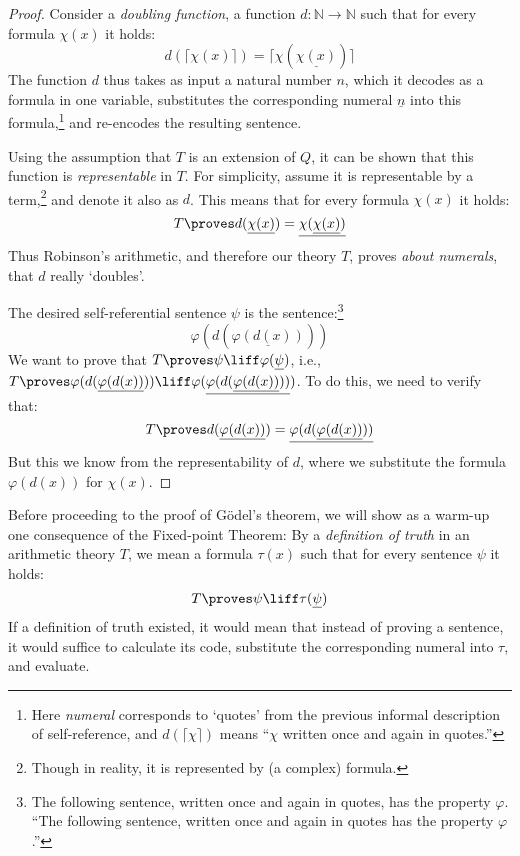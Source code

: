     \begin{proof} Consider a \emph{doubling function}, a function $d\colon\mathbb N\to\mathbb N$ such that for every formula $\chi(x)$ it holds:
    $$
    d(\lceil \chi(x)\rceil)=\lceil\chi(\underline{\chi(x)})\rceil
    $$
    The function $d$ thus takes as input a natural number $n$, which it decodes as a formula in one variable, substitutes the corresponding numeral $\underline{n}$ into this formula,\footnote{Here \emph{numeral} corresponds to `quotes' from the previous informal description of self-reference, and $d(\lceil\chi\rceil)$ means ``$\chi$ written once and again in quotes.''} and re-encodes the resulting sentence.
    
    Using the assumption that $T$ is an extension of $Q$, it can be shown that this function is \emph{representable} in $T$. For simplicity, assume it is representable by a term,\footnote{Though in reality, it is represented by (a complex) formula.} and denote it also as $d$. This means that for every formula $\chi(x)$ it holds:
    $$
    T\proves d(\underline{\chi(x)})=\underline{\chi(\underline{\chi(x)})}
    $$
    Thus Robinson's arithmetic, and therefore our theory $T$, proves \emph{about numerals}, that $d$ really `doubles'.
    
    The desired self-referential sentence $\psi$ is the sentence:\footnote{The following sentence, written once and again in quotes, has the property $\varphi$. ``The following sentence, written once and again in quotes has the property $\varphi$.''}
    $$
    \varphi(d(\underline{\varphi(d(x))}))
    $$
    We want to prove that $T\proves \psi \liff \varphi(\underline{\psi})$, i.e., $T \proves \varphi(d(\underline{\varphi(d(x))}))\liff\varphi(\underline{\varphi(d(\underline{\varphi(d(x))}))})$. To do this, we need to verify that:
    $$
    T \proves d(\underline{\varphi(d(x))})=\underline{\varphi(d(\underline{\varphi(d(x))}))}
    $$
    But this we know from the representability of $d$, where we substitute the formula $\varphi(d(x))$ for $\chi(x)$.
    \end{proof}
    
    Before proceeding to the proof of Gödel's theorem, we will show as a warm-up one consequence of the Fixed-point Theorem: By a \emph{definition of truth} in an arithmetic theory $T$, we mean a formula $\tau(x)$ such that for every sentence $\psi$ it holds: 
    $$
    T\proves\psi\liff\tau(\underline{\psi})
    $$
    If a definition of truth existed, it would mean that instead of proving a sentence, it would suffice to calculate its code, substitute the corresponding numeral into $\tau$, and evaluate.
    
